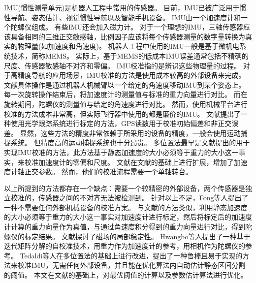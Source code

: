 \documentclass[
  type=master
]{gdutthesis}
\begin{document}
IMU(惯性测量单元)是机器人工程中常用的传感器。
目前，IMU已被广泛用于惯性导航、姿态估计、视觉惯性导航以及智能手机设备\cite{saha2022tinyodom,qiu2022compensation,jung2022photometric,guo2022robust}。
IMU由一个加速度计和一个陀螺仪组成。
有些IMU还会加入磁力计。
对于一个理想的IMU，三轴传感器应该具备相同的三维正交敏感轴，比例因子应该将每个传感器测量的数字量转换为真实的物理量(如加速度和角速度)。
机器人工程中使用的IMU一般是基于微机电系统技术，简称MEMS。
实际上，基于MEMS的低成本IMU误差通常包括不精确的尺度、传感器敏感轴不对齐和零偏。
IMU校准指的是辨识这些物理量的过程。
对于高精度导航的应用场景，IMU校准的方法是使用成本较高的外部设备来完成。
文献\parencite{hall2000case}具体操作是通过机器人机械臂以一个给定的角速度移动IMU到某个姿态上。
每一次旋转操作结束后，将加速度计的测量值与标准的重力向量进行对比。
而在旋转期间，陀螺仪的测量值与给定的角速度进行对比。
然而，使用机械平台进行校准的方法成本非常高，但实际飞行器中使用的都是廉价的IMU。
文献\parencite{kim2004initial}提出了一种使用光学跟踪系统进行标定的方法，GPS读数用于校准初始偏差和非正交误差。
显然，这些方法的精度非常依赖于所采用的设备的精度，一般会使用运动捕捉系统。
但精度高的运动捕捉系统也十分昂贵。
多位置法最早是文献\parencite{lotters1998procedure}提出的用于实现IMU校准的方法，此方法基于静态加速度的大小必须等于重力的大小这一事实，来校准加速度计的零偏和尺度。
文献\parencite{syed2007new}在文献\parencite{lotters1998procedure}的基础上进行扩展，增加了加速度计轴正交参数。
然而，他们的校准流程需要一个单轴转台。

以上所提到的方法都存在一个缺点：需要一个较精密的外部设备，两个传感器是独立校准的，传感器之间的不对齐无法被检测到。
针对以上不足，Fong等人提出了一种不需要任何外部机械设备的校准方案\cite{fong2008methods}。
与文献\parencite{lotters1998procedure}的方法类似，\parencite{fong2008methods}利用静态加速度的大小必须等于重力的大小这一事实对加速度计进行标定，然后将标定后的加速度计计算的重力向量作为真值，与通过角速度积分得到的重力向量进行对比，得到陀螺仪的标定结果。
文献\parencite{cheuk2012automatic}探讨了磁场的局部稳定性。
Hwangbo等人提出了一种基于迭代矩阵分解的自校准技术，用重力作为加速度计的参考，用相机作为陀螺仪的参考\cite{hwangbo2013imu}。
Tedaldi等人在多位置法的基础上进行改进，提出了一种鲁棒且易于实现的方法来校准IMU，无需任何外部设备\cite{tedaldi2014robust}，并且能在优化算法内自动估计静态区间分割的阈值。
本文在文献\parencite{tedaldi2014robust}的基础上，对最优阈值的计算以及参数估计算法进行优化。
\end{document}
